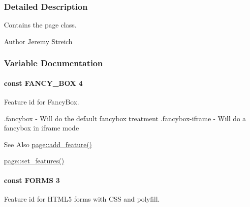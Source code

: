 \subsubsection{Detailed Description}
Contains the page class. \begin{DoxyAuthor}{Author}
Jeremy Streich 
\end{DoxyAuthor}


\subsubsection{Variable Documentation}
\hypertarget{page_8inc_8php_a229d49a07467652cd3159526ef05dfc7}{
\paragraph[{F\-A\-N\-C\-Y\-\_\-\-B\-O\-X}]{\setlength{\rightskip}{0pt plus 5cm}const F\-A\-N\-C\-Y\-\_\-\-B\-O\-X 4}}\label{page_8inc_8php_a229d49a07467652cd3159526ef05dfc7}


Feature id for Fancy\-Box. 

{\ttfamily .fancybox} -\/ Will do the default fancybox treatment {\ttfamily .fancybox-\/iframe} -\/ Will do a fancybox in iframe mode \begin{DoxySeeAlso}{See Also}
\hyperlink{classpage_a417d01aff00de8193f7f9f6a9eac8635}{page\-::add\-\_\-feature()} 

\hyperlink{classpage_a17f91936047fb8ba40b8dff21d5b2f55}{page\-::set\-\_\-features()} 
\end{DoxySeeAlso}
\hypertarget{page_8inc_8php_a3ea935ef7154d72d22c8394a15a1f326}{
\paragraph[{F\-O\-R\-M\-S}]{\setlength{\rightskip}{0pt plus 5cm}const F\-O\-R\-M\-S 3}}\label{page_8inc_8php_a3ea935ef7154d72d22c8394a15a1f326}


Feature id for H\-T\-M\-L5 forms with C\-S\-S and polyfill. 

